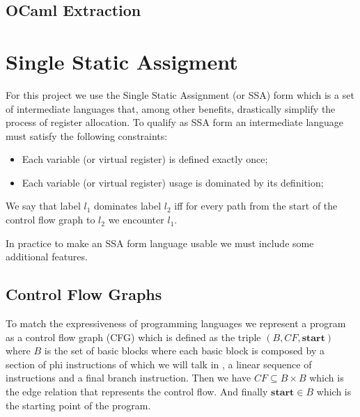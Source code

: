 \subsection{OCaml Extraction}

\section{Single Static Assigment}
\label{sec:ssa}
For this project we use the Single Static Assignment (or SSA) form which is a set of intermediate languages that, among other benefits, drastically simplify the process of register allocation.
To qualify as SSA form an intermediate language must satisfy the following constraints:
\begin{itemize}
    \item Each variable (or virtual register) is defined exactly once;
    \item Each variable (or virtual register) usage is dominated by its definition;
\end{itemize}
We say that label $l_1$ dominates label $l_2$ iff for every path from the start of the control flow graph to $l_2$ we encounter $l_1$.

In practice to make an SSA form language usable we must include some additional features.

\subsection{Control Flow Graphs}
\label{subsec:cfg}
To match the expressiveness of programming languages we represent a program as a control flow graph (CFG) which is defined as the triple $(B, CF, \textbf{start})$ where $B$ is the set of basic blocks where each basic block is composed by a section of phi instructions of which we will talk in , a linear sequence of instructions and a final branch instruction. Then we have $CF \subseteq B \times B$ which is the edge relation that represents the control flow. And finally $\textbf{start} \in B$ which is the starting point of the program.

